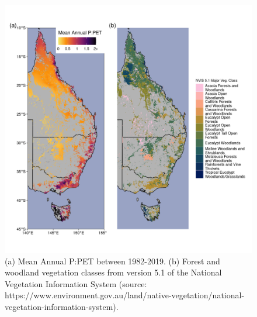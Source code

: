 \documentclass[gc, manuscript]{copernicus}
\begin{document}
\appendixfigures

\clearpage
\begin{figure}
\includegraphics[width=14cm]{../../figures/appendix-A/SM_Fig1_map_eastOz_MAPPET_NVIS} \caption{(a) Mean Annual P:PET between 1982-2019. (b) Forest and woodland vegetation classes from version 5.1 of the National Vegetation Information System (source: https://www.environment.gov.au/land/native-vegetation/national-vegetation-information-system).}\label{fig:FigA1}
\end{figure}
\clearpage
\end{document}
